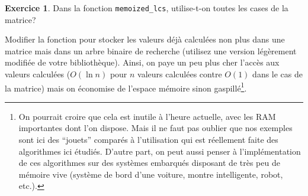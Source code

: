 \documentclass[french,a4paper]{article}
\theoremstyle{definition}
\newtheorem{exercise}{Exercice}
\theoremstyle{remark}
\newcommand{\inlinec}[1]{\lstinline[style=C]°#1°}
\begin{document}
\begin{exercise}
  Dans la fonction \inlinec{memoized_lcs}, utilise-t-on toutes les
  cases de la matrice?

  Modifier la fonction pour stocker les valeurs déjà calculées non
  plus dans une matrice mais dans un arbre binaire de recherche
  (utilisez une version légèrement modifiée de votre
  bibliothèque). Ainsi, on paye un peu plus cher l'accès aux valeurs
  calculées ($O(\ln n)$ pour $n$ valeurs calculées contre $O(1)$ dans
  le cas de la matrice) mais on économise de l'espace mémoire sinon
  gaspillé\footnote{On pourrait croire que cela est inutile à l'heure
    actuelle, avec les RAM importantes dont l'on dispose. Mais il ne
    faut pas oublier que nos exemples sont ici des ``jouets'' comparés
    à l'utilisation qui est réellement faite des algorithmes ici
    étudiés. D'autre part, on peut aussi penser à l'implémentation de
    ces algorithmes sur des systèmes embarqués disposant de très peu
    de mémoire vive (système de bord d'une voiture, montre
    intelligente, robot, etc.).}.
\end{exercise} 
\end{document}
